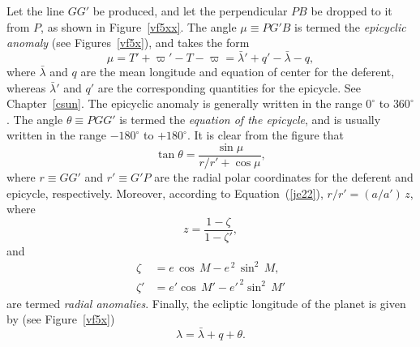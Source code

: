 Let the line $GG'$ be produced, and let the perpendicular $PB$ be
dropped to it from $P$, as shown in Figure~\ref{vf5xx}. The angle $\mu\equiv PG'B$
is termed the {\em epicyclic anomaly}\/ (see Figures~\ref{vf5x}), and takes the form
\begin{equation}
\mu =T'+\varpi' - T - \varpi = \bar{\lambda}' + q' - \bar{\lambda}-q,
\end{equation}
where $\bar{\lambda}$ and $q$ are the mean longitude and equation of center for the
deferent, whereas $\bar{\lambda}'$ and $q'$ are the corresponding quantities for  the
epicycle. See Chapter~\ref{csun}. The epicyclic anomaly is generally written in the 
range $0^\circ$ to $360^\circ$. 
 The angle $\theta\equiv PGG'$ is termed the {\em equation of the epicycle}, and is usually written in the range $-180^\circ$ to $+180^\circ$.
It is clear from the figure that
\begin{equation}
\tan\theta = \frac{\sin\mu}{r/r'+ \cos\mu},
\end{equation}
where $r\equiv GG'$ and $r'\equiv G'P$ are the radial polar coordinates for the deferent and epicycle,
respectively. 
Moreover, according to Equation~(\ref{je22}), $r/r' = (a/a')\,z$, where
\begin{equation}\label{ezdef}
z = \frac{1-\zeta}{1-\zeta'},
\end{equation}
and
\begin{align}
\zeta &= e\,\cos\,M -e^{\,2}\,\sin^2\,M,\\[0.5ex]
\zeta' &= e'\cos\,M' -e'^{\,2}\sin^2\,M'
\end{align}
are termed {\em radial anomalies}. 
Finally, the ecliptic longitude of the planet is given by  (see Figure~\ref{vf5x})
\begin{equation}
\lambda = \bar{\lambda} + q + \theta.
\end{equation}

